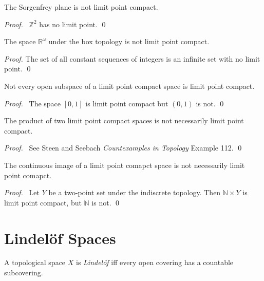 \begin{prop}
The Sorgenfrey plane is not limit point compact.
\end{prop}

\begin{proof}
 \pf\ $\mathbb{Z}^2$ has no limit point. \qed
\end{proof}

\begin{prop}
 The space $\mathbb{R}^\omega$ under the box topology is not limit point
compact.
\end{prop}

\begin{proof}
\pf The set of all constant sequences of integers is an infinite set with no
limit point. \qed
\end{proof}

\begin{prop}
 Not every open subspace of a limit point compact space is limit point compact.
\end{prop}

\begin{proof}
 \pf\ The space $[0,1]$ is limit point compact but $(0,1)$ is not. \qed
\end{proof}

\begin{prop}
 The product of two limit point compact spaces is not necessarily limit point compact.
\end{prop}

\begin{proof}
 \pf\ See Steen and Seebach \emph{Countexamples in Topology} Example 112. \qed
\end{proof}

\begin{prop}
 The continuous image of a limit point comapct space is not necessarily limit point comapct.
\end{prop}

\begin{proof}
 \pf\ Let $Y$ be a two-point set under the indiscrete topology. Then $\mathbb{N}
 \times Y$ is limit point compact, but $\mathbb{N}$ is not. \qed
\end{proof}

\section{Lindel\"{o}f Spaces}

  \begin{df}
  A topological space $X$ is \emph{Lindel\"{o}f} iff every open covering has
  a countable subcovering.
\end{df}

